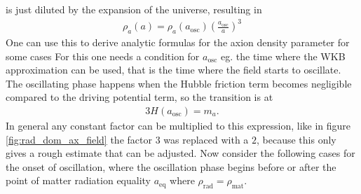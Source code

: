 \documentclass[a4paper, 12pt]{article}
\begin{document}
is just diluted by the expansion of the universe, resulting in \cite[Chap. 4.3.1, Page 28]{MarshAxionCosmo}
\begin{align}
    \label{eq:wkb_axion_denity}
    \rho_a(a) = \rho_a(a_\mathrm{osc}) \left( \frac{a_\mathrm{osc}}{a} \right)^3
\end{align}
One can use this to derive analytic formulas for the axion density parameter for some cases \cite[Chap 4.3.1, Page 28]{MarshAxionCosmo}
For this one needs a condition for $a_\mathrm{osc}$ eg. the time where the WKB approximation can be used, that is the time where the field starts to
oscillate.
The oscillating phase happens when the Hubble friction term becomes negligible compared to the driving potential term,
so the transition is at
\begin{align}
    \label{eq:a_osc_cond}
    3 H(a_\mathrm{osc}) = m_a.
\end{align}
In general any constant factor can be multiplied to this expression, like in figure \ref{fig:rad_dom_ax_field} the factor  $3$
was replaced with a $2$, because this only gives a rough estimate that can be adjusted.
Now consider the following cases for the onset of oscillation, where the oscillation phase
begins before or after the point of matter radiation equality $a_\mathrm{eq}$ where $\rho_\mathrm{rad} = \rho_\mathrm{mat}$.
\end{document}
